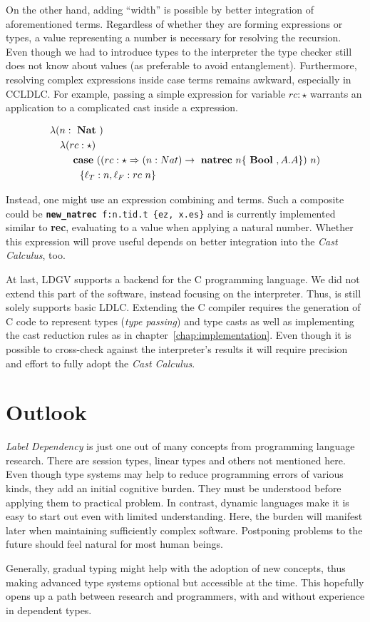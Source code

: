 On the other hand, adding ``width'' is possible by better integration of aforementioned \rec terms. Regardless of whether they are forming expressions or types, a value representing a number is necessary for resolving the recursion. Even though we had to introduce types to the interpreter the type checker still does not know about values (as preferable to avoid entanglement). Furthermore, resolving complex expressions inside case terms remains awkward, especially in CCLDLC. For example, passing a simple \rec expression for variable $rc : \star$ warrants an application to a complicated cast inside a \case expression.

\begin{equation}
\begin{split}
&\lambda (n:\text{ \textbf{Nat} }) \\
&\quad\lambda (rc: \star) \\
&\qquad\text{ \textbf{case} } ((rc : \star \Rightarrow (n:Nat) \rightarrow \text{ \textbf{natrec} } n \{\text{ \textbf{Bool} }, A.A\} )~n) \\
&\quad\qquad \{\ell_T: n, \ell_F: rc~n\}
\end{split}
\end{equation}

Instead, one might use an expression combining \rec and \natrec terms. Such a composite could be \texttt{\textbf{new\_natrec} f:n.tid.t \{ez, x.es\}} and is currently implemented similar to \textbf{rec}, evaluating to a value when applying a natural number. Whether this expression will prove useful depends on better integration into the \emph{Cast Calculus}, too.

At last, LDGV supports a backend for the C programming language. We did not extend this part of the software, instead focusing on the interpreter. Thus, is still solely supports basic LDLC. Extending the C compiler requires the generation of C code to represent types (\emph{type passing}) and type casts as well as implementing the cast reduction rules as in chapter~\ref{chap:implementation}. Even though it is possible to cross-check against the interpreter's results it will require precision and effort to fully adopt the \emph{Cast Calculus}.

\section{Outlook}

\emph{Label Dependency} is just one out of many concepts from programming language research. There are session types, linear types and others not mentioned here. Even though type systems may help to reduce programming errors of various kinds, they add an initial cognitive burden. They must be understood before applying them to practical problem. In contrast, dynamic languages make it is easy to start out even with limited understanding. Here, the burden will manifest later when maintaining sufficiently complex software. Postponing problems to the future should feel natural for most human beings.

Generally, gradual typing might help with the adoption of new concepts, thus making advanced type systems optional but accessible at the time. This hopefully opens up a path between research and programmers, with and without experience in dependent types. 